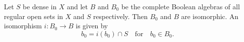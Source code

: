 Let $S$ be dense in $X$ and let $B$ and $B_0$ be the complete Boolean algebras of all regular open sets in $X$ and $S$ respectively. Then $B_0$ and $B$ are isomorphic. An isomorphism $i: B_0 \rightarrow B$ is given by
$$b_0 = i(b_0) \cap S \quad \text{for} \quad b_0 \in B_0.$$
